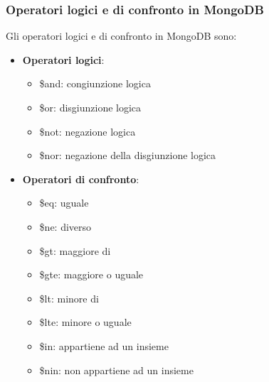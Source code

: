 \documentclass[a4paper,twoside]{article}
\begin{document}
\subsubsection{Operatori logici e di confronto in MongoDB}
Gli operatori logici e di confronto in MongoDB sono:
\begin{itemize}
  \item \textbf{Operatori logici}:
    \begin{itemize}
      \item \$and: congiunzione logica
      \item \$or:  disgiunzione logica
      \item \$not: negazione logica
      \item \$nor: negazione della disgiunzione logica
    \end{itemize}

  \item \textbf{Operatori di confronto}:
    \begin{itemize}
      \item \$eq: uguale
      \item \$ne: diverso
      \item \$gt: maggiore di
      \item \$gte: maggiore o uguale
      \item \$lt: minore di
      \item \$lte: minore o uguale
      \item \$in: appartiene ad un insieme
      \item \$nin: non appartiene ad un insieme
    \end{itemize}
\end{itemize}
\end{document}
